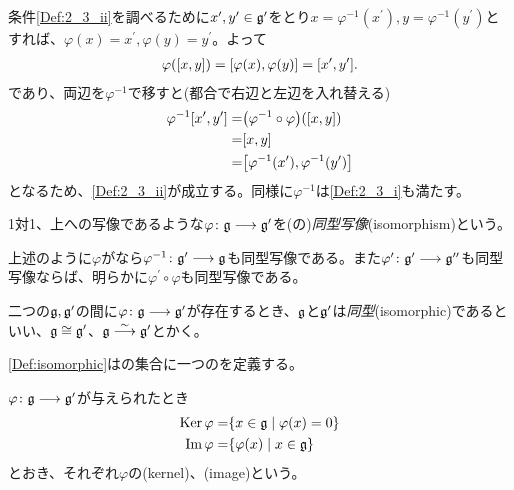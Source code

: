\documentclass[fleqn,twocolumn,titlepage,dvipdfmx]{jsarticle}
\begin{document}
\begin{Proof}
  条件\ref{Def:2_3_ii}を調べるために$x^{\prime},y^{\prime}\in\mathfrak{g}^{\prime}$をとり$x=\varphi^{-1}(x^{\prime}),y=\varphi^{-1}(y^{\prime})$とすれば、$\varphi(x)=x^{\prime},\varphi(y)=y^{\prime}$。よって
  \begin{align*}
    \varphi\qty(\comm{x}{y})=\comm{\varphi(x)}{\varphi(y)}=\comm{x^{\prime}}{y^{\prime}}.
  \end{align*}
  であり、両辺を$\varphi^{-1}$で移すと(都合で右辺と左辺を入れ替える)
  \begin{align*}
    \varphi^{-1}\comm{x^{\prime}}{y^{\prime}} =& \qty(\varphi^{-1}\circ\varphi)\qty(\comm{x}{y}) \\
    =& \comm{x}{y} \\
    =& \comm{\varphi^{-1}(x^{\prime})}{\varphi^{-1}(y^{\prime})}
  \end{align*}
  となるため、\ref{Def:2_3_ii}が成立する。同様に$\varphi^{-1}$は\ref{Def:2_3_i}も満たす。
\end{Proof}

\begin{named}
  1対1、上への写像であるような{}$\varphi\colon\mathfrak{g}\longrightarrow\mathfrak{g}^{\prime}$を({}の)\emph{同型写像}(isomorphism)という。
\end{named}

\begin{remark}
  上述のように$\varphi$がなら$\varphi^{-1}\colon\mathfrak{g}^{\prime}\longrightarrow\mathfrak{g}$も同型写像である。また$\varphi^{\prime}\colon\mathfrak{g}^{\prime}\longrightarrow\mathfrak{g}^{{\prime\prime}}$も同型写像ならば、明らかに$\varphi^{\prime}\circ\varphi$も同型写像である。
\end{remark}

\begin{definition}[リー環の同型]\label{Def:isomorphic}
  二つの{}$\mathfrak{g},\mathfrak{g}^{\prime}$の間に$\varphi\colon\mathfrak{g}\longrightarrow\mathfrak{g}^{\prime}$が存在するとき、$\mathfrak{g}$と$\mathfrak{g}^{\prime}$は\emph{同型}(isomorphic)であるといい、$\mathfrak{g}\cong\mathfrak{g}^{\prime}$、$\mathfrak{g} \stackrel{\sim}{\longrightarrow}\mathfrak{g}^{\prime}$とかく。
\end{definition}

\begin{remark}
  \cref{Def:isomorphic}は{}の集合に一つの{}を定義する。
\end{remark}

\begin{definition}[核と像]\label{Def:ker_im}
  {}$\varphi\colon\mathfrak{g}\longrightarrow\mathfrak{g}^{\prime}$が与えられたとき
  \begin{align*}
    \operatorname{Ker}\varphi =& \qty{x\in\mathfrak{g}\mid\varphi(x)=0} \\
    \Im\varphi =& \qty{\varphi(x)\mid x\in\mathfrak{g}}
  \end{align*}
  とおき、それぞれ$\varphi$の(kernel)、(image)という。
\end{definition}
\end{document}
